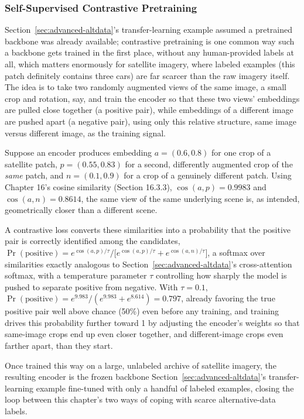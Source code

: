 \documentclass[../ai_in_finance]{subfiles}
\begin{document}
\subsubsection*{Self-Supervised Contrastive Pretraining}

Section~\ref{sec:advanced-altdata}'s transfer-learning example assumed a pretrained backbone was already available; contrastive pretraining is one common way such a backbone gets trained in the first place, without any human-provided labels at all, which matters enormously for satellite imagery, where labeled examples (this patch definitely contains three cars) are far scarcer than the raw imagery itself. The idea is to take two randomly augmented views of the same image, a small crop and rotation, say, and train the encoder so that these two views' embeddings are pulled close together (a positive pair), while embeddings of a different image are pushed apart (a negative pair), using only this relative structure, same image versus different image, as the training signal.

Suppose an encoder produces embedding $a = (0.6, 0.8)$ for one crop of a satellite patch, $p = (0.55, 0.83)$ for a second, differently augmented crop of the \emph{same} patch, and $n = (0.1, 0.9)$ for a crop of a genuinely different patch. Using Chapter 16's cosine similarity (Section 16.3.3), $\cos(a,p) = 0.9983$ and $\cos(a,n) = 0.8614$, the same view of the same underlying scene is, as intended, geometrically closer than a different scene.

A contrastive loss converts these similarities into a probability that the positive pair is correctly identified among the candidates, $\Pr(\text{positive}) = e^{\cos(a,p)/\tau} / \big[e^{\cos(a,p)/\tau} + e^{\cos(a,n)/\tau}\big]$, a softmax over similarities exactly analogous to Section~\ref{sec:advanced-altdata}'s cross-attention softmax, with a temperature parameter $\tau$ controlling how sharply the model is pushed to separate positive from negative. With $\tau = 0.1$, $\Pr(\text{positive}) = e^{9.983}/(e^{9.983} + e^{8.614}) = 0.797$, already favoring the true positive pair well above chance (50\%) even before any training, and training drives this probability further toward 1 by adjusting the encoder's weights so that same-image crops end up even closer together, and different-image crops even farther apart, than they start.

Once trained this way on a large, unlabeled archive of satellite imagery, the resulting encoder is the frozen backbone Section~\ref{sec:advanced-altdata}'s transfer-learning example fine-tuned with only a handful of labeled examples, closing the loop between this chapter's two ways of coping with scarce alternative-data labels.
\end{document}

